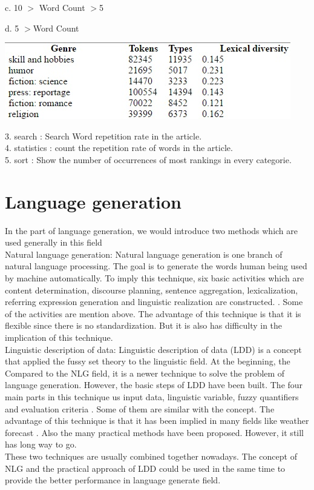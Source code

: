 c. 10 $>$ Word Count $>$5 

d. 5 $>$Word Count

\begin{center}
	\includegraphics[width=\columnwidth]{union_02.jpg}
\end{center}
3. search       : Search Word repetition rate in the article.\\
4. statistics     : count the repetition rate of words in the article.\\
5. sort         : Show the  number of occurrences of most rankings in every categorie.\\




\section*{Language generation}
\label{sec:prob}
In the part of language generation, we would introduce two methods which are used generally in this field  \\
Natural language generation: Natural language generation is one branch of natural language processing. The goal is to generate the words human being used by machine automatically. To imply this technique, six basic activities which are content determination, discourse planning, sentence aggregation, lexicalization, referring expression generation and linguistic realization are constructed. \cite{aramossoto2016onthe}. Some of the activities are mention above. The advantage of this technique is that it is flexible since there is no standardization. But it is also has difficulty in the implication of this technique.\\
Linguistic description of data: Linguistic description of data (LDD) is a concept that applied the fussy set theory to the linguistic field. At the beginning, the Compared to the NLG field, it is a newer technique to solve the problem of language generation. However, the basic steps of LDD have been built. The four main parts in this technique us input data, linguistic variable, fuzzy quantifiers and evaluation criteria \cite{aramossoto2016onthe}. Some of them are similar with the concept. The advantage of this technique is that it has been implied in many fields like weather forecast \cite{Ramos-SotoBBT14}. Also the many practical methods have been proposed. However, it still has long way to go.\\
These two techniques are usually combined together nowadays. The concept of NLG and the practical approach of LDD could be used in the same time to provide the better performance in language generate field.


